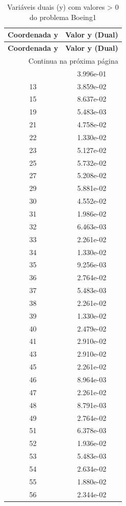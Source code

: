 \documentclass[12pt]{article}
\begin{document}
\begin{longtable}{@{}cc@{}}
\caption{Variáveis duais (y) com valores > 0 do problema Boeing1} \\
\toprule
\textbf{Coordenada y} & \textbf{Valor y (Dual)} \\
\midrule
\endfirsthead

\toprule
\textbf{Coordenada y} & \textbf{Valor y (Dual)} \\
\midrule
\endhead

\midrule \multicolumn{2}{r}{{Continua na próxima página}} \\ \midrule
\endfoot

\bottomrule
\endlastfoot
3 & 3.996e-01 \\
13 & 3.859e-02 \\
15 & 8.637e-02 \\
19 & 5.483e-03 \\
21 & 4.758e-02 \\
22 & 1.330e-02 \\
23 & 5.127e-02 \\
25 & 5.732e-02 \\
27 & 5.208e-02 \\
29 & 5.881e-02 \\
30 & 4.552e-02 \\
31 & 1.986e-02 \\
32 & 6.463e-03 \\
33 & 2.261e-02 \\
34 & 1.330e-02 \\
35 & 9.256e-03 \\
36 & 2.764e-02 \\
37 & 5.483e-03 \\
38 & 2.261e-02 \\
39 & 1.330e-02 \\
40 & 2.479e-02 \\
41 & 2.910e-02 \\
43 & 2.910e-02 \\
45 & 2.261e-02 \\
46 & 8.964e-03 \\
47 & 2.261e-02 \\
48 & 8.791e-03 \\
49 & 2.764e-02 \\
51 & 6.378e-03 \\
52 & 1.936e-02 \\
53 & 5.483e-03 \\
54 & 2.634e-02 \\
55 & 1.880e-02 \\
56 & 2.344e-02 \\

\end{longtable}
\end{document}
